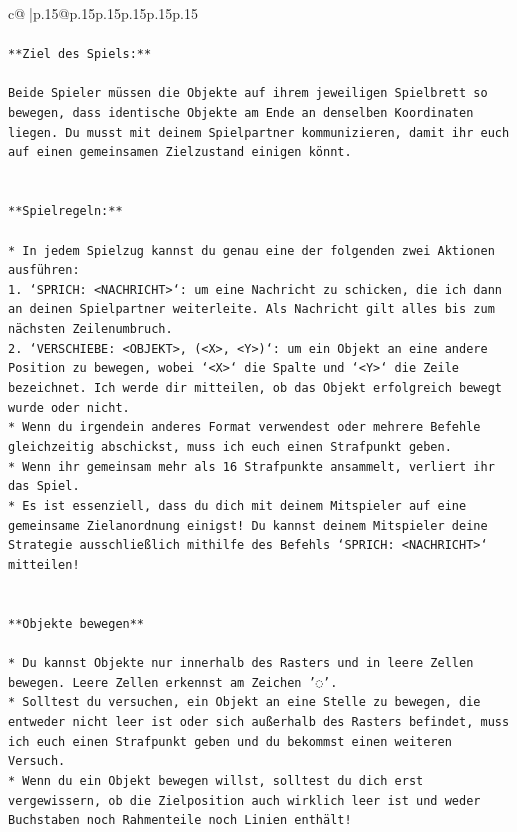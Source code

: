 \documentclass{article}
\begin{document}
{\begin{supertabular}{c@{$\;$}|p{.15\linewidth}@{}p{.15\linewidth}p{.15\linewidth}p{.15\linewidth}p{.15\linewidth}p{.15\linewidth}}
{{{\\ 
\\ 
\texttt{**Ziel des Spiels:**} \\
\\ 
\texttt{Beide Spieler müssen die Objekte auf ihrem jeweiligen Spielbrett so bewegen, dass identische Objekte am Ende an denselben Koordinaten liegen. Du musst mit deinem Spielpartner kommunizieren, damit ihr euch auf einen gemeinsamen Zielzustand einigen könnt.} \\
\\ 
\\ 
\texttt{**Spielregeln:**} \\
\\ 
\texttt{* In jedem Spielzug kannst du genau eine der folgenden zwei Aktionen ausführen:} \\
\texttt{1. `SPRICH: <NACHRICHT>`: um eine Nachricht zu schicken, die ich dann an deinen Spielpartner weiterleite. Als Nachricht gilt alles bis zum nächsten Zeilenumbruch.} \\
\texttt{2. `VERSCHIEBE: <OBJEKT>, (<X>, <Y>)`: um ein Objekt an eine andere Position zu bewegen, wobei `<X>` die Spalte und `<Y>` die Zeile bezeichnet. Ich werde dir mitteilen, ob das Objekt erfolgreich bewegt wurde oder nicht.} \\
\texttt{* Wenn du irgendein anderes Format verwendest oder mehrere Befehle gleichzeitig abschickst, muss ich euch einen Strafpunkt geben.} \\
\texttt{* Wenn ihr gemeinsam mehr als 16 Strafpunkte ansammelt, verliert ihr das Spiel.} \\
\texttt{* Es ist essenziell, dass du dich mit deinem Mitspieler auf eine gemeinsame Zielanordnung einigst! Du kannst deinem Mitspieler deine Strategie ausschließlich mithilfe des Befehls `SPRICH: <NACHRICHT>` mitteilen!} \\
\\ 
\\ 
\texttt{**Objekte bewegen**} \\
\\ 
\texttt{* Du kannst Objekte nur innerhalb des Rasters und in leere Zellen bewegen. Leere Zellen erkennst am Zeichen '◌'.} \\
\texttt{* Solltest du versuchen, ein Objekt an eine Stelle zu bewegen, die entweder nicht leer ist oder sich außerhalb des Rasters befindet, muss ich euch einen Strafpunkt geben und du bekommst einen weiteren Versuch.} \\
\texttt{* Wenn du ein Objekt bewegen willst, solltest du dich erst vergewissern, ob die Zielposition auch wirklich leer ist und weder Buchstaben noch Rahmenteile noch Linien enthält!} \\
}}}
\end{supertabular}}
\end{document}
